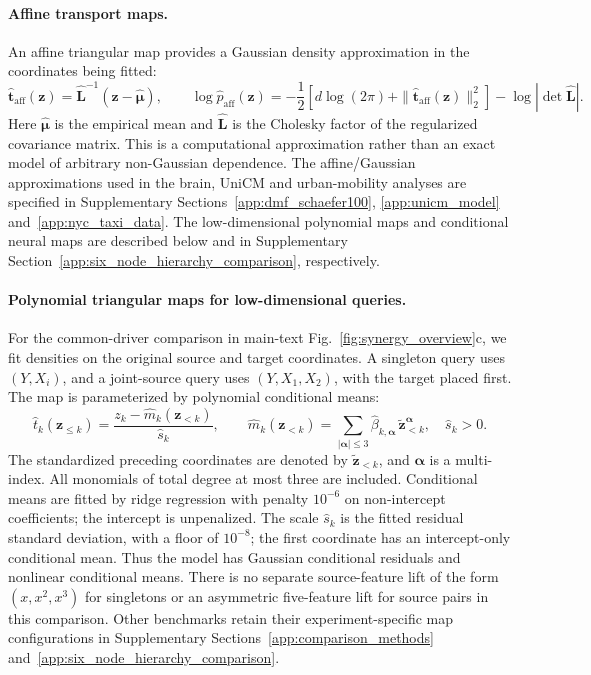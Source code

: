 {\color{red}
\paragraph{Affine transport maps.}
An affine triangular map provides a Gaussian density approximation in the coordinates being fitted:
\begin{equation}
\widehat{\boldsymbol{t}}_{\mathrm{aff}}(\boldsymbol{z})
=\widehat{\mathbf{L}}^{-1}(\boldsymbol{z}-\widehat{\boldsymbol{\mu}}),
\qquad
\log\widehat p_{\mathrm{aff}}(\boldsymbol{z})
=-\frac12\left[d\log(2\pi)+\|\widehat{\boldsymbol{t}}_{\mathrm{aff}}(\boldsymbol{z})\|_2^2\right]
-\log|\det\widehat{\mathbf{L}}|.
\label{eq:affine-transport-density}
\end{equation}
Here \(\widehat{\boldsymbol{\mu}}\) is the empirical mean and \(\widehat{\mathbf{L}}\) is the Cholesky factor of the regularized covariance matrix. This is a computational approximation rather than an exact model of arbitrary non-Gaussian dependence. The affine/Gaussian approximations used in the brain, UniCM and urban-mobility analyses are specified in Supplementary Sections~\ref{app:dmf_schaefer100}, \ref{app:unicm_model} and~\ref{app:nyc_taxi_data}. The low-dimensional polynomial maps and conditional neural maps are described below and in Supplementary Section~\ref{app:six_node_hierarchy_comparison}, respectively.

\paragraph{Polynomial triangular maps for low-dimensional queries.}
For the common-driver comparison in main-text Fig.~\ref{fig:synergy_overview}c, we fit densities on the original source and target coordinates. A singleton query uses \((Y,X_i)\), and a joint-source query uses \((Y,X_1,X_2)\), with the target placed first. The map is parameterized by polynomial conditional means:
\begin{equation}
\widehat t_k(\boldsymbol{z}_{\leq k})
=\frac{z_k-\widehat m_k(\boldsymbol{z}_{<k})}{\widehat s_k},
\qquad
\widehat m_k(\boldsymbol{z}_{<k})
=\sum_{|\boldsymbol{\alpha}|\leq 3}
\widehat\beta_{k,\boldsymbol{\alpha}}\,
\widetilde{\boldsymbol{z}}_{<k}^{\boldsymbol{\alpha}},
\quad \widehat s_k>0.
\label{eq:polynomial-transport-map}
\end{equation}
The standardized preceding coordinates are denoted by \(\widetilde{\boldsymbol{z}}_{<k}\), and \(\boldsymbol{\alpha}\) is a multi-index. All monomials of total degree at most three are included. Conditional means are fitted by ridge regression with penalty \(10^{-6}\) on non-intercept coefficients; the intercept is unpenalized. The scale \(\widehat s_k\) is the fitted residual standard deviation, with a floor of \(10^{-8}\); the first coordinate has an intercept-only conditional mean. Thus the model has Gaussian conditional residuals and nonlinear conditional means. There is no separate source-feature lift of the form \((x,x^2,x^3)\) for singletons or an asymmetric five-feature lift for source pairs in this comparison. Other benchmarks retain their experiment-specific map configurations in Supplementary Sections~\ref{app:comparison_methods} and~\ref{app:six_node_hierarchy_comparison}.

}
